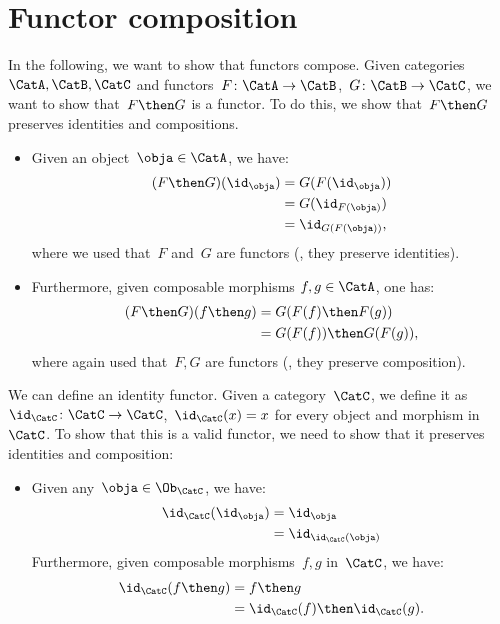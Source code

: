 

\section{Functor composition}


In the following, we want to show that functors compose.
Given categories~$\CatA,\CatB,\CatC$ and functors~$F\colon \CatA\to \CatB$,~$G\colon \CatB\to \CatC$, we want to show that~$F\then G$ is a functor. To do this, we show that~$F\then G$ preserves identities and compositions.
\begin{itemize}
  \item Given an object~$\obja\in \CatA$, we have:
  \begin{equation*}
    \begin{aligned}
    (F\then G)(\id_\obja)
      &=G(F(\id_\obja))\\
      &=G(\id_{F(\obja)})\\
      &=\id_{G(F(\obja))},
    \end{aligned}
  \end{equation*}
  where we used that~$F$ and~$G$ are functors (\ie , they preserve identities).
  \item Furthermore, given composable morphisms $f,g\in \CatA$, one has:
  \begin{equation*}
    \begin{aligned}
    (F\then G)(f\then g)
      &=G(F(f)\then F(g))\\
      &=G(F(f))\then G(F(g)),
    \end{aligned}
  \end{equation*}
  where again used that~$F,G$ are functors (\ie , they preserve composition).
\end{itemize}


We can define an identity functor. Given a category~$\CatC$, we define it as~$\id_\CatC\colon \CatC \to \CatC$,~$\id_\CatC(x)=x$ for every object and morphism in~$\CatC$. To show that this is a valid functor, we need to show that it preserves identities and composition:
\begin{itemize}
  \item Given any~$\obja \in \Ob_\CatC$, we have:
  \begin{equation*}
    \begin{aligned}
      \id_\CatC(\id_\obja)&=\id_\obja\\
      &=\id_{\id_\CatC(\obja)}
    \end{aligned}
  \end{equation*}
  Furthermore, given composable morphisms~$f,g$ in~$\CatC$, we have:
  \begin{equation*}
    \begin{aligned}
      \id_{\CatC}(f\then g)&=f\then g\\
      &=\id_{\CatC}(f)\then \id_{\CatC} (g).
    \end{aligned}
  \end{equation*}
\end{itemize}


